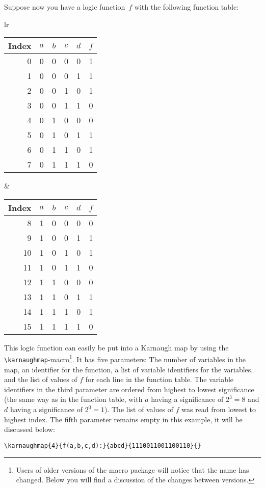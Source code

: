 \documentclass{article}
\begin{document}
Suppose now you have a logic function~$f$ with the following function table: 

\begin{center}

\begin{tabular}{lr}
  \begin{tabular}[t]{r|cccc|c}
Index&$a$&$b$&$c$&$d$&$f$\\
\hline
0&0&0&0&0&1\\
1&0&0&0&1&1\\
2&0&0&1&0&1\\
3&0&0&1&1&0\\
4&0&1&0&0&0\\
5&0&1&0&1&1\\
6&0&1&1&0&1\\
7&0&1&1&1&0\\
  \end{tabular}
&
  \begin{tabular}[t]{r|cccc|c}
Index&$a$&$b$&$c$&$d$&$f$\\
\hline
8&1&0&0&0&0\\
9&1&0&0&1&1\\
10&1&0&1&0&1\\
11&1&0&1&1&0\\
12&1&1&0&0&0\\
13&1&1&0&1&1\\
14&1&1&1&0&1\\
15&1&1&1&1&0\\
  \end{tabular}
\end{tabular}
\end{center}

This logic function can easily be put into a Karnaugh map by using the
\verb|\karnaughmap|-macro\footnote{Users of older versions of the macro
package will notice that the name has changed. Below you will find a
discussion of the changes between versions.}. It has five parameters: The
number of variables in the  map, an identifier for the function, a list of
variable identifiers for the variables, and the list of  values of $f$ for
each line in the function table. The variable identifiers in the third
parameter are ordered from highest to lowest significance (the same way as in
the function table, with $a$ having a significance of $2^3=8$ and $d$ having a
significance of $2^0=1$). The list of values of $f$ was read from lowest to
highest index. The fifth parameter remains empty in this example, it will be
discussed below:

\begin{verbatim}
\karnaughmap{4}{f(a,b,c,d):}{abcd}{1110011001100110}{}
\end{verbatim}
\end{document}
